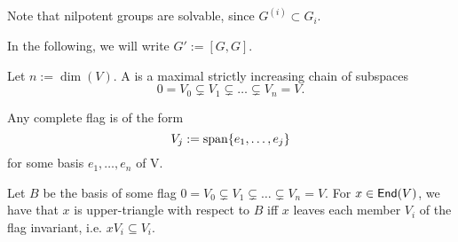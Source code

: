 Note that nilpotent groups are solvable, since $G^{(i)} \subset G_i$.
\begin{notation}
In the following, we will write $G' := [G,G]$.
\end{notation}
\begin{definition}
Let $n := \dim (V)$. A  is a maximal strictly increasing chain of subspaces
\[ 0 = V_0 \subsetneq V_1 \subsetneq \ldots \subsetneq V_n = V. \]
\end{definition}
Any complete flag is of the form
\[ V_j := \mathrm{span} \{ e_1, \ldots, e_j\} \]
for some basis $e_1, \ldots, e_n$ of V.

Let $B$ be the basis of some flag $0 = V_0 \subsetneq V_1 \subsetneq \ldots \subsetneq V_n = V$.
For $x \in \textsf{End}(V)$, we have that $x$ is upper-triangle with respect to $B$ iff $x$ leaves each member $V_i$ of the flag invariant, i.e. $xV_i \subseteq V_i.$

